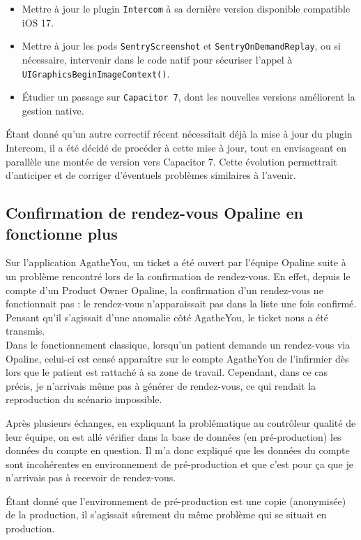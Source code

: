 \documentclass{article}
\begin{document}
\begin{itemize}
\item Mettre à jour le plugin \texttt{Intercom} à sa dernière version disponible compatible iOS 17.
\item Mettre à jour les pods \texttt{SentryScreenshot} et \texttt{SentryOnDemandReplay}, ou si nécessaire, intervenir dans le code natif pour sécuriser l'appel à \texttt{UIGraphicsBeginImageContext()}.
\item Étudier un passage sur \texttt{Capacitor 7}, dont les nouvelles versions améliorent la gestion native.
\end{itemize}

Étant donné qu'un autre correctif récent nécessitait déjà la mise à jour du plugin Intercom, il a été décidé de procéder à cette mise à jour, tout en envisageant en parallèle une montée de version vers Capacitor 7. Cette évolution permettrait d'anticiper et de corriger d'éventuels problèmes similaires à l'avenir.

\subsection{ Confirmation de rendez-vous Opaline en fonctionne plus}

Sur l'application AgatheYou, un ticket a été ouvert par l'équipe Opaline suite à un problème rencontré lors de la confirmation de rendez-vous. En effet, depuis le compte d'un Product Owner Opaline, la confirmation d'un rendez-vous ne fonctionnait pas : le rendez-vous n'apparaissait pas dans la liste une fois confirmé. Pensant qu'il s'agissait d'une anomalie côté AgatheYou, le ticket nous a été transmis. \\

Dans le fonctionnement classique, lorsqu'un patient demande un rendez-vous via Opaline, celui-ci est censé apparaître sur le compte AgatheYou de l'infirmier dès lors que le patient est rattaché à sa zone de travail. Cependant, dans ce cas précis, je n'arrivais même pas à générer de rendez-vous, ce qui rendait la reproduction du scénario impossible.

Après plusieurs échanges, en expliquant la problématique au contrôleur qualité de leur équipe, on est allé vérifier dans la base de données (en pré-production) les données du compte en question. Il m'a donc expliqué que les données du compte sont incohérentes en environnement de pré-production et que c'est pour ça que je n'arrivais pas à recevoir de rendez-vous.

Étant donné que l'environnement de pré-production est une copie (anonymisée) de la production, il s'agissait sûrement du même problème qui se situait en production. \\
\end{document}
